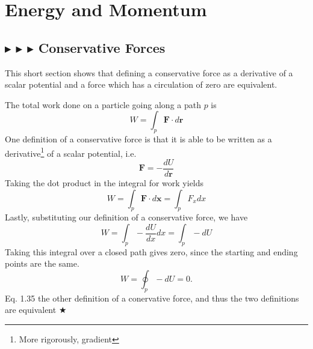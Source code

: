 \clearpage
\section{Energy and Momentum}
\subsection{\color{PineGreen} $\blacktriangleright$ \color{Goldenrod} $\blacktriangleright$ \color{Orchid} $\blacktriangleright$ \color{black} Conservative Forces} \label{1.3.1}
This short section shows that defining a conservative force as a derivative of a scalar potential and a force which has a circulation of zero are equivalent. 

\noindent The total work done on a particle going along a path $p$ is 
\begin{equation}
    W = \int_p \mathbf{F}\cdot d\mathbf{r}
\end{equation}
\noindent One definition of a conservative force is that it is able to be written as a derivative\footnote{More rigorously, gradient} of a scalar potential, i.e.
\begin{equation}
    \mathbf{F} = -\frac{dU}{d\mathbf{r}}
\end{equation}
\noindent Taking the dot product in the integral for work yields
\begin{equation}
    W = \int_p \mathbf{F}\cdot d\mathbf{x} = \int_p F_xdx
\end{equation}
Lastly, substituting our definition of a conservative force, we have 
\begin{equation}
    W = \int_p - \frac{dU}{dx}dx = \int_p -dU
\end{equation}
\noindent Taking this integral over a closed path gives zero, since the starting and ending points are the same.
\begin{equation}
    W=\oint_p -dU = 0.
\end{equation}
Eq. 1.35 the other definition of a conervative force, and thus the two definitions are equivalent $\bigstar$

